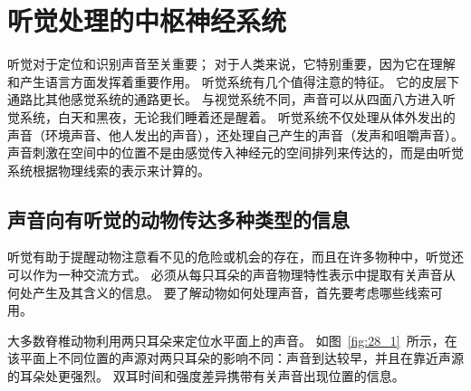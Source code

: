 \chapter{听觉处理的中枢神经系统} \label{chap:chap28}

听觉对于定位和识别声音至关重要；
对于人类来说，它特别重要，因为它在理解和产生语言方面发挥着重要作用。
听觉系统有几个值得注意的特征。
它的皮层下通路比其他感觉系统的通路更长。
与视觉系统不同，声音可以从四面八方进入听觉系统，白天和黑夜，无论我们睡着还是醒着。
听觉系统不仅处理从体外发出的声音（环境声音、他人发出的声音），还处理自己产生的声音（发声和咀嚼声音）。
声音刺激在空间中的位置不是由感觉传入神经元的空间排列来传达的，而是由听觉系统根据物理线索的表示来计算的。



\section{声音向有听觉的动物传达多种类型的信息}


听觉有助于提醒动物注意看不见的危险或机会的存在，而且在许多物种中，听觉还可以作为一种交流方式。
必须从每只耳朵的声音物理特性表示中提取有关声音从何处产生及其含义的信息。
要了解动物如何处理声音，首先要考虑哪些线索可用。


大多数脊椎动物利用两只耳朵来定位水平面上的声音。
如图~\ref{fig:28_1}~所示，在该平面上不同位置的声源对两只耳朵的影响不同：声音到达较早，并且在靠近声源的耳朵处更强烈。
双耳时间和强度差异携带有关声音出现位置的信息。




